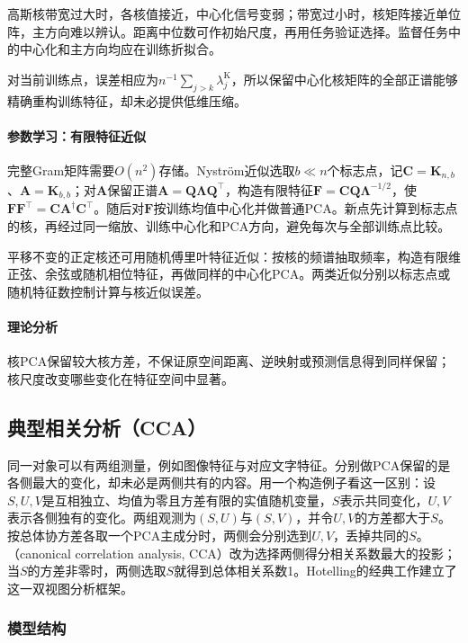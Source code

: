 高斯核带宽过大时，各核值接近，中心化信号变弱；带宽过小时，核矩阵接近单位阵，主方向难以辨认。距离中位数可作初始尺度，再用任务验证选择。监督任务中的中心化和主方向均应在训练折拟合。

对当前训练点，误差相应为$n^{-1}\sum_{j>k}\lambda_j^{\mathrm K}$，所以保留中心化核矩阵的全部正谱能够精确重构训练特征，却未必提供低维压缩。

\paragraph{参数学习：有限特征近似}

完整Gram矩阵需要$O(n^2)$存储。Nystr\"om近似选取$b\ll n$个标志点，记$\bm C=\bm K_{n,b}$、$\bm A=\bm K_{b,b}$；对$\bm A$保留正谱$\bm A=\bm Q\bm\Lambda\bm Q^\top$，构造有限特征$\bm F=\bm C\bm Q\bm\Lambda^{-1/2}$，使$\bm F\bm F^\top=\bm C\bm A^\dagger\bm C^\top$。随后对$\bm F$按训练均值中心化并做普通PCA。新点先计算到标志点的核，再经过同一缩放、训练中心化和PCA方向，避免每次与全部训练点比较。

平移不变的正定核还可用随机傅里叶特征近似：按核的频谱抽取频率，构造有限维正弦、余弦或随机相位特征，再做同样的中心化PCA。两类近似分别以标志点或随机特征数控制计算与核近似误差。

\paragraph{理论分析}

核PCA保留较大核方差，不保证原空间距离、逆映射或预测信息得到同样保留；核尺度改变哪些变化在特征空间中显著。

\subsection{典型相关分析（CCA）}
\label{sec:dim-cca}

同一对象可以有两组测量，例如图像特征与对应文字特征。分别做PCA保留的是各侧最大的变化，却未必是两侧共有的内容。用一个构造例子看这一区别：设$S,U,V$是互相独立、均值为零且方差有限的实值随机变量，$S$表示共同变化，$U,V$表示各侧独有的变化。两组观测为$(S,U)$与$(S,V)$，并令$U,V$的方差都大于$S$。按总体协方差各取一个PCA主成分时，两侧会分别选到$U,V$，丢掉共同的$S$。（canonical correlation analysis, CCA）改为选择两侧得分相关系数最大的投影；当$S$的方差非零时，两侧选取$S$就得到总体相关系数1。Hotelling的经典工作建立了这一双视图分析框架。

\subsubsection{模型结构}
\label{sec:dim-cca-structure}

